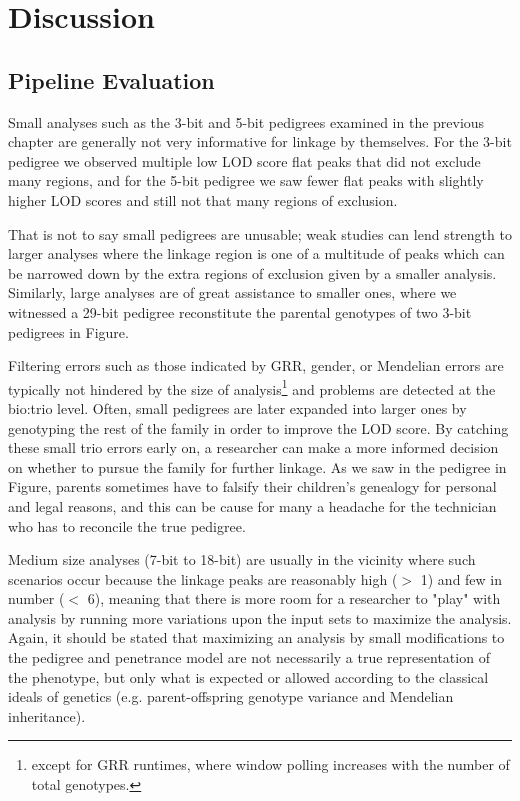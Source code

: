 \chapter{Discussion}

\section{Pipeline Evaluation}

Small analyses such as the 3-bit and 5-bit pedigrees examined in the previous chapter are generally not very informative for linkage by themselves. For the 3-bit pedigree we observed multiple low LOD score flat peaks that did not exclude many regions, and for the 5-bit pedigree we saw fewer flat peaks with slightly higher LOD scores and still not that many regions of exclusion.

That is not to say small pedigrees are unusable; weak studies can lend strength to larger analyses where the linkage region is one of a multitude of peaks which can be narrowed down by the extra regions of exclusion given by a smaller analysis. Similarly, large analyses are of great assistance to smaller ones, where we witnessed a 29-bit pedigree reconstitute the parental genotypes of two 3-bit pedigrees in Figure.

Filtering errors such as those indicated by GRR, gender, or Mendelian errors are typically not hindered by the size of analysis\footnote{except for GRR runtimes, where window polling increases with the number of total genotypes.} and problems are detected at the \gls{bio:trio} level. Often, small pedigrees are later expanded into larger ones by genotyping the rest of the family in order to improve the LOD score. By catching these small trio errors early on, a researcher can make a more informed decision on whether to pursue the family for further linkage. As we saw in the pedigree in Figure, parents sometimes have to falsify their children's genealogy for personal and legal reasons, and this can be cause for many a headache for the technician who has to reconcile the true pedigree.

Medium size analyses (7-bit to 18-bit) are usually in the vicinity where such scenarios occur because the linkage peaks are reasonably high ($>$ 1) and few in number ($<$ 6), meaning that there is more room for a researcher to "play" with analysis by running more variations upon the input sets to maximize the analysis. Again, it should be stated that maximizing an analysis by small modifications to the pedigree and penetrance model are not necessarily a true representation of the phenotype, but only what is expected or allowed according to the classical ideals of genetics (e.g. parent-offspring genotype variance and Mendelian inheritance).

